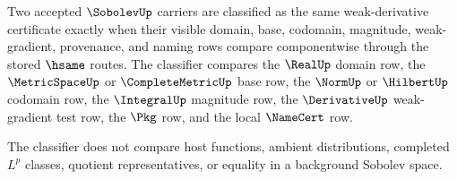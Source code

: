 \begin{definition}
\label{def:sobolev-classifier}
Two accepted $\SobolevUp$ carriers are classified as the same weak-derivative certificate exactly when their visible domain, base, codomain, magnitude, weak-gradient, provenance, and naming rows compare componentwise through the stored $\hsame$ routes. The classifier compares the $\RealUp$ domain row, the $\MetricSpaceUp$ or $\CompleteMetricUp$ base row, the $\NormUp$ or $\HilbertUp$ codomain row, the $\IntegralUp$ magnitude row, the $\DerivativeUp$ weak-gradient test row, the $\Pkg$ row, and the local $\NameCert$ row.

The classifier does not compare host functions, ambient distributions, completed $L^p$ classes, quotient representatives, or equality in a background Sobolev space.
\end{definition}

